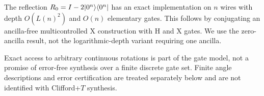 \begin{fact}\label{fact:r0}
The reflection $R_0=I-2\lvert 0^n\rangle\langle 0^n\rvert$ has an exact implementation on $n$ wires with depth $O(L(n)^2)$ and $O(n)$ elementary gates. This follows by conjugating an ancilla-free multicontrolled X construction with H and X gates\cite[Theorem~6]{nie2024}. We use the zero-ancilla result, not the logarithmic-depth variant requiring one ancilla.
\end{fact}

Exact access to arbitrary continuous rotations is part of the gate model, not a promise of error-free synthesis over a finite discrete gate set. Finite angle descriptions and error certification are treated separately below and are not identified with Clifford+$T$ synthesis.
